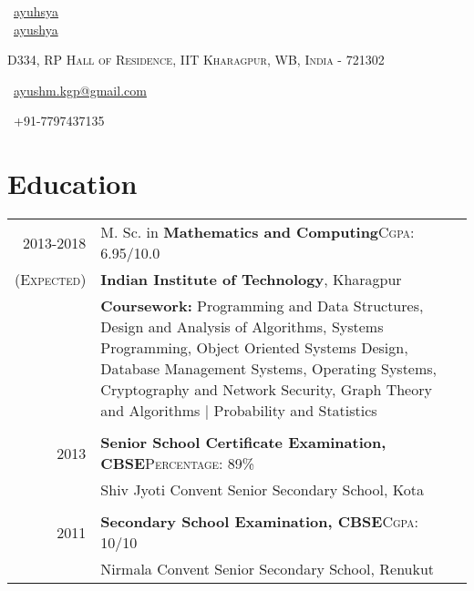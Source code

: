 \documentclass[a4paper,11pt]{extarticle} %
\begin{document}
\pagestyle{empty} %


\begin{multicols}{3}
\normalsize \faGithub\ {\href{https://github.com/ayuhsya}{ayuhsya}}\\
\normalsize  \faLinkedinSquare\ {\href{https://www.linkedin.com/in/ayushya}{ayushya}}\\
\columnbreak
\normalsize\par{\par} %
\par{\centering\footnotesize {\textsc{D334, RP Hall of Residence, IIT Kharagpur, WB, India - 721302}}\hfill\par}
\columnbreak
\raggedright\hfill\normalsize \faEnvelope\ {\href{mailto:ayushm.kgp@gmail.com}{ayushm.kgp@gmail.com}}\\
\raggedright\hfill{\faPhone\ +91-7797437135}
\end{multicols}


\vspace{-0.6cm}
\section{Education}

\begin{tabular}{r|p{17.5cm}}	
2013-2018 & M. Sc. in \textbf{Mathematics and Computing}\hfill\textsc{Cgpa}: 6.95/10.0\\
\textsc{(Expected)}&\textbf{Indian Institute of Technology}, Kharagpur\\
& \footnotesize{\textbf{Coursework: }{Programming and Data Structures, Design and Analysis of Algorithms, Systems Programming, Object Oriented Systems Design, Database
Management Systems, Operating Systems, Cryptography and Network Security, Graph Theory and Algorithms | Probability and Statistics}}\\
\multicolumn{2}{c}{} \\
2013 & \textbf{Senior School Certificate Examination, CBSE}\hfill\textsc{Percentage}: 89\%\\
& \footnotesize{Shiv Jyoti Convent Senior Secondary School, Kota}\\
\multicolumn{2}{c}{} \\
2011 & \textbf{Secondary School Examination, CBSE}\hfill\textsc{Cgpa}: 10/10\\
& \footnotesize{Nirmala Convent Senior Secondary School, Renukut}\\
\end{tabular}
\end{document}
